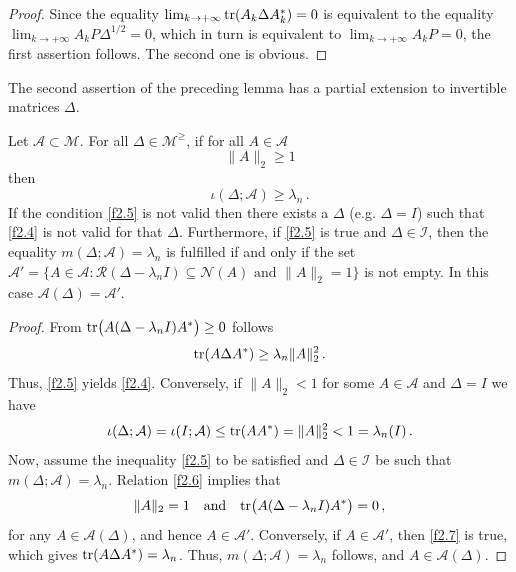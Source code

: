 \documentclass{amsart}
\begin{document}
\begin{proof}
Since the equality $\lim_{k\to+\infty} {\rm tr}(A_k\Delta A_k^*) = 0$ is equivalent to the equality $\lim_{k\to+\infty} A_kP\Delta^{1/2} = 0$, which in turn is equivalent to $\lim_{k\to+\infty} A_kP = 0$, the first assertion follows. The second one is obvious.
\end{proof}


The second assertion of the preceding lemma has a partial extension to invertible matrices $\Delta$.

\begin{pro} \label{p2.4}
  Let ${\mathcal A} \subset {\mathcal M}$. For all $\Delta \in{\mathcal M}^\geq$, if for all $A\in{\mathcal A}$
     \begin{equation} \label{f2.5}
         \|A\|_2 \geq 1 
     \end{equation}
  then    
     \begin{equation} \label{f2.4}
         \iota(\Delta;{\mathcal A}) \geq \lambda_n \, .
     \end{equation}
  If the condition \eqref{f2.5} is not valid then there exists a $\Delta$ (e.g. $\Delta = I$) such that \eqref{f2.4}  is not valid for that $\Delta$.
  Furthermore, if \eqref{f2.5} is true and $\Delta \in {\mathcal I}$, then the equality $m(\Delta;{\mathcal A}) = \lambda_n$ is fulfilled if and only if the set ${\mathcal A}' = \{ A\in {\mathcal A} : {\mathcal R}(\Delta-\lambda_nI) \subseteq {\mathcal N}(A) \mbox{ and } \|A\|_2=1 \}$ is not empty. In this case ${\mathcal A}(\Delta) = {\mathcal A}'$.
\end{pro}

\begin{proof}
From ${\rm tr}\bigl( A(\Delta-\lambda_nI)A^* \bigr) \geq 0$ follows
\begin{equation} \label{f2.6}
     {\rm tr}(A\Delta A^*) \geq   \lambda_n \|A\|_2^2 \, .
\end{equation}
Thus, \eqref{f2.5} yields \eqref{f2.4}. Conversely, if $\|A\|_2<1$ for some $A\in {\mathcal A}$ and $\Delta = I$ we have
\[ 
    \iota(\Delta;{\mathcal A})  = \iota(I;{\mathcal A}) \leq {\rm tr}(A A^*) =  \|A\|_2^2 < 1 = \lambda_n (I) \, . 
\]
Now, assume the inequality  \eqref{f2.5} to be satisfied and $\Delta \in {\mathcal I}$ be such that $m(\Delta;{\mathcal A}) = \lambda_n$. Relation \eqref{f2.6} implies that
\begin{equation} \label{f2.7}
    \|A\|_2=1 \quad\mbox{and} \quad  {\rm tr}\bigl(A(\Delta-\lambda_nI)A^*\bigr) = 0 \, ,
\end{equation}
for any $A \in {\mathcal A}(\Delta)$, and hence $A\in {\mathcal A}'$. Conversely, if $A\in {\mathcal A}'$, then \eqref{f2.7} is true, which gives
${\rm tr}(A\Delta A^*) = \lambda_n$. Thus, $m(\Delta;{\mathcal A}) = \lambda_n$ follows, and $A\in{\mathcal A}(\Delta)$.
\end{proof}
\end{document}
